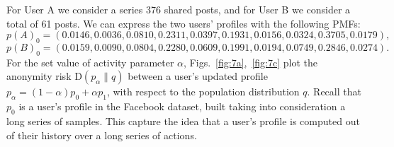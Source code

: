 For User A we consider a series 376 shared posts, and for User B we consider a total of 61 posts. We can express the two users' profiles with the following PMFs:
$$p(A)_0=(0.0146,0.0036,0.0810,0.2311,0.0397,0.1931,0.0156,0.0324,0.3705,0.0179),$$
$$p(B)_0=(0.0159,0.0090,0.0804,0.2280,0.0609,0.1991,0.0194,0.0749,0.2846,0.0274).$$
For the set value of activity parameter $\alpha$, Figs.~\ref{fig:7a},~\ref{fig:7c} plot the anonymity risk $\mathrm{D}(p_\alpha\|q)$ between a user's updated profile $p_\alpha=(1-\alpha)p_0+\alpha p_1$, with respect to the population distribution $q$. Recall that $p_0$ is a user's profile in the Facebook dataset, built taking into consideration a long series of samples. This capture the idea that a user's profile is computed out of their history over a long series of actions. 
\begin{figure}[htb]
	\centering
	\hfil
	\\
	\hfil
\end{figure}
